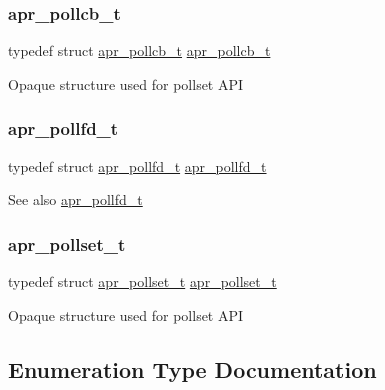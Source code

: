 \subsubsection{\texorpdfstring{apr\+\_\+pollcb\+\_\+t}{apr\_pollcb\_t}}
{\footnotesize\ttfamily typedef struct \mbox{\hyperlink{structapr__pollcb__t}{apr\+\_\+pollcb\+\_\+t}} \mbox{\hyperlink{structapr__pollcb__t}{apr\+\_\+pollcb\+\_\+t}}}

Opaque structure used for pollset A\+PI \mbox{\label{group__apr__poll_ga0c89b184cbe2337e44207f1ad245129b}} 
\subsubsection{\texorpdfstring{apr\+\_\+pollfd\+\_\+t}{apr\_pollfd\_t}}
{\footnotesize\ttfamily typedef struct \mbox{\hyperlink{structapr__pollfd__t}{apr\+\_\+pollfd\+\_\+t}} \mbox{\hyperlink{structapr__pollfd__t}{apr\+\_\+pollfd\+\_\+t}}}

\begin{DoxySeeAlso}{See also}
\mbox{\hyperlink{structapr__pollfd__t}{apr\+\_\+pollfd\+\_\+t}} 
\end{DoxySeeAlso}
\mbox{\label{group__apr__poll_ga680da1f10ac5ef75efc503a9d15b8906}} 
\subsubsection{\texorpdfstring{apr\+\_\+pollset\+\_\+t}{apr\_pollset\_t}}
{\footnotesize\ttfamily typedef struct \mbox{\hyperlink{structapr__pollset__t}{apr\+\_\+pollset\+\_\+t}} \mbox{\hyperlink{structapr__pollset__t}{apr\+\_\+pollset\+\_\+t}}}

Opaque structure used for pollset A\+PI 

\subsection{Enumeration Type Documentation}
\mbox{\label{group__apr__poll_ga0a8549d84c1721788b102a4cc8b4b0f0}} 
